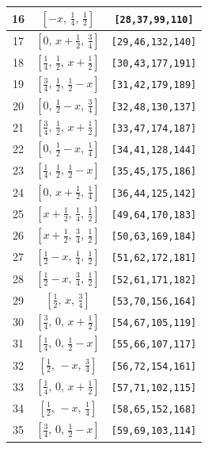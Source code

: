 \documentclass[fleqn,8pt]{jsarticle}
\begin{document}
\begin{longtable}{ccc}
16 & $\left[ - x,\, \frac{1}{4},\, \frac{1}{2} \right]$ & {\tt [28,37,99,110]} \\ \hline
17 & $\left[ 0,\, x + \frac{1}{2},\, \frac{3}{4} \right]$ & {\tt [29,46,132,140]} \\ \hline
18 & $\left[ \frac{1}{4},\, \frac{1}{2},\, x + \frac{1}{2} \right]$ & {\tt [30,43,177,191]} \\ \hline
19 & $\left[ \frac{3}{4},\, \frac{1}{2},\, \frac{1}{2} - x \right]$ & {\tt [31,42,179,189]} \\ \hline
20 & $\left[ 0,\, \frac{1}{2} - x,\, \frac{3}{4} \right]$ & {\tt [32,48,130,137]} \\ \hline
21 & $\left[ \frac{3}{4},\, \frac{1}{2},\, x + \frac{1}{2} \right]$ & {\tt [33,47,174,187]} \\ \hline
22 & $\left[ 0,\, \frac{1}{2} - x,\, \frac{1}{4} \right]$ & {\tt [34,41,128,144]} \\ \hline
23 & $\left[ \frac{1}{4},\, \frac{1}{2},\, \frac{1}{2} - x \right]$ & {\tt [35,45,175,186]} \\ \hline
24 & $\left[ 0,\, x + \frac{1}{2},\, \frac{1}{4} \right]$ & {\tt [36,44,125,142]} \\ \hline
25 & $\left[ x + \frac{1}{2},\, \frac{1}{4},\, \frac{1}{2} \right]$ & {\tt [49,64,170,183]} \\ \hline
26 & $\left[ x + \frac{1}{2},\, \frac{3}{4},\, \frac{1}{2} \right]$ & {\tt [50,63,169,184]} \\ \hline
27 & $\left[ \frac{1}{2} - x,\, \frac{1}{4},\, \frac{1}{2} \right]$ & {\tt [51,62,172,181]} \\ \hline
28 & $\left[ \frac{1}{2} - x,\, \frac{3}{4},\, \frac{1}{2} \right]$ & {\tt [52,61,171,182]} \\ \hline
29 & $\left[ \frac{1}{2},\, x,\, \frac{3}{4} \right]$ & {\tt [53,70,156,164]} \\ \hline
30 & $\left[ \frac{3}{4},\, 0,\, x + \frac{1}{2} \right]$ & {\tt [54,67,105,119]} \\ \hline
31 & $\left[ \frac{1}{4},\, 0,\, \frac{1}{2} - x \right]$ & {\tt [55,66,107,117]} \\ \hline
32 & $\left[ \frac{1}{2},\, - x,\, \frac{3}{4} \right]$ & {\tt [56,72,154,161]} \\ \hline
33 & $\left[ \frac{1}{4},\, 0,\, x + \frac{1}{2} \right]$ & {\tt [57,71,102,115]} \\ \hline
34 & $\left[ \frac{1}{2},\, - x,\, \frac{1}{4} \right]$ & {\tt [58,65,152,168]} \\ \hline
35 & $\left[ \frac{3}{4},\, 0,\, \frac{1}{2} - x \right]$ & {\tt [59,69,103,114]} \\ \hline

\end{longtable}
\end{document}
